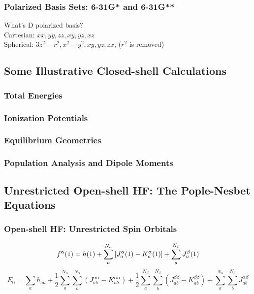 \documentclass[a4paper]{article}
\numberwithin{equation}{section}
\begin{document}
\subsubsection{Polarized Basis Sets: 6-31G* and 6-31G**}
What's D polarized basis?\\
Cartesian: $ xx, yy, zz, xy, yz, xz  $\\
Spherical: $ 3z^2-r^2, x^2-y^2, xy, yz, zx $, ($ r^2 $ is removed)

\subsection{Some Illustrative Closed-shell Calculations}
\subsubsection{Total Energies}

\subsubsection{Ionization Potentials}

\subsubsection{Equilibrium Geometries}

\subsubsection{Population Analysis and Dipole Moments}

\subsection{Unrestricted Open-shell HF: The Pople-Nesbet Equations}
\subsubsection{Open-shell HF: Unrestricted Spin Orbitals}
\begin{equation}\label{key}
f^\alpha(1) = h(1) + \sum_a^{N_\alpha}\qty[J_a^\alpha(1) - K_a^{\alpha}(1) ] + \sum_a^{N_\beta} J_a^\beta(1) 
\end{equation}
\begin{equation}\label{key}
E_0 = \sum_a h_{aa} + \dfrac{1}{2}\sum_a^{N_\alpha}\sum_b^{N_\alpha} (J_{ab}^{\alpha\alpha} - K_{ab}^{\alpha\alpha}) + \dfrac{1}{2}\sum_a^{N_\beta}\sum_b^{N_\beta} (J_{ab}^{\beta\beta} - K_{ab}^{\beta\beta}) 
+ \sum_a^{N_\alpha}\sum_b^{N_\beta} J_{ab}^{\alpha\beta}
\end{equation}
\end{document}
